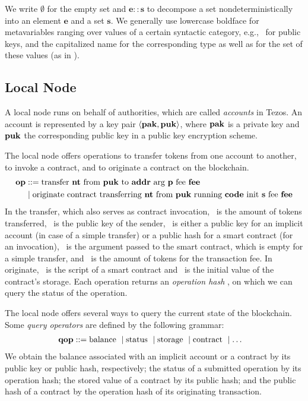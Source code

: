 \documentclass[runningheads]{llncs}
\begin{document}
We write $\emptyset$ for the empty set and $\mathbf{e :: s}$ to
decompose a set nondeterministically into an element $\mathbf{e}$ and a set
$\mathbf{s}$. We generally use lowercase boldface for metavariables
ranging over values of a certain syntactic category, e.g., \PUK\ for
public keys, and the capitalized name for the
corresponding type as well as for the set of these values (as in \TPUK).

\subsection{Local Node}
\label{sec:local-node}

A local node runs on behalf of authorities, which are called
\emph{accounts} in Tezos. An account is represented by a key pair $\Angle{
  \PAK, \PUK
} $, where $\PAK$ is a private key and $\PUK$ the corresponding public
key in a public key encryption scheme.

The local node offers operations to transfer tokens from one account
to another, to invoke a contract, and to originate a contract on the blockchain.
\begin{align*}
  \OP &::= \TRANSFER[\PARAMETER]\NTEZ\PUK\ADDR\MTEZ
  \\&\mid \ORIGINATE\NTEZ\PUK\CODE\INIT\MTEZ
\end{align*}
In the transfer, which also serves as contract invocation, \NTEZ\ is the amount of tokens transferred, \PUK\ is the public key of the
sender, \ADDR\ is either a public 
key for an implicit account (in case of a simple transfer)  or a
public hash for a smart contract (for an invocation), \PARAMETER\ is
the argument passed to the smart contract, 
which is empty for a simple transfer, and \MTEZ\ is
the amount of tokens for the transaction fee. In originate,  \CODE\ is
the script of a smart contract and \INIT\ is the initial value of the
contract's storage. Each operation returns an \emph{operation hash}
\OPH, on which we can query the status of the operation.

The local node offers several ways to query the current state of
the blockchain.
Some \emph{query operators} are defined by the following grammar:
\begin{align*}
  \QOP & ::=
         \GETBALANCE{}%
  \mid \GETSTATUS{}%
  \mid \GETSTORAGE{}%
         \mid \GETCONTRACT{}%
         \mid \dots
\end{align*}
We obtain the balance associated with an implicit account or a
contract by its public key or public hash, respectively; the status of
a submitted operation by its operation hash; the stored value of a
contract by its public hash; and the public hash of a contract by the
operation hash of its originating transaction.
\end{document}
